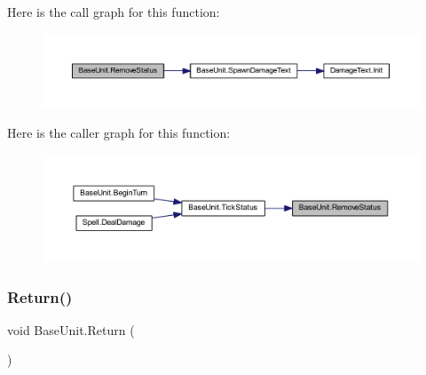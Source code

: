 Here is the call graph for this function\+:\nopagebreak
\begin{figure}[H]
\begin{center}
\leavevmode
\includegraphics[width=350pt]{class_base_unit_a15cf13fa9b4b776f474ad03b42939139_cgraph}
\end{center}
\end{figure}
Here is the caller graph for this function\+:\nopagebreak
\begin{figure}[H]
\begin{center}
\leavevmode
\includegraphics[width=350pt]{class_base_unit_a15cf13fa9b4b776f474ad03b42939139_icgraph}
\end{center}
\end{figure}
\mbox{\label{class_base_unit_a3091e5ab7a6bd3488f9c0987208a1f4d}} 
\subsubsection{\texorpdfstring{Return()}{Return()}}
{\footnotesize\ttfamily void Base\+Unit.\+Return (\begin{DoxyParamCaption}{ }\end{DoxyParamCaption})}

